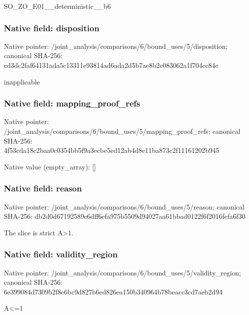 \documentclass[10pt,a4paper]{article}
\begin{document}
\begingroup\raggedright\sloppy SO\_\allowbreak{}ZO\_\allowbreak{}E01\_\allowbreak{}\_\allowbreak{}deterministic\_\allowbreak{}\_\allowbreak{}b6\par\endgroup

\subsubsection{Native field: disposition}
Native pointer: /joint\_\allowbreak{}analysis/comparisons/6/bound\_\allowbreak{}uses/5/disposition; canonical SHA-256: cd3dc2faf64131ada5c13311e93814ad6ada2d5b7ae8b2c083062a1f704cc84e

\begingroup\raggedright\sloppy inapplicable\par\endgroup

\subsubsection{Native field: mapping\_\allowbreak{}proof\_\allowbreak{}refs}
Native pointer: /joint\_\allowbreak{}analysis/comparisons/6/bound\_\allowbreak{}uses/5/mapping\_\allowbreak{}proof\_\allowbreak{}refs; canonical SHA-256: 4f53cda18c2baa0c0354bb5f9a3ecbe5ed12ab4d8e11ba873c2f11161202b945

Native value (empty\_\allowbreak{}array): []

\subsubsection{Native field: reason}
Native pointer: /joint\_\allowbreak{}analysis/comparisons/6/bound\_\allowbreak{}uses/5/reason; canonical SHA-256: db2d0d67192589e6dff6efa975b5509d94027aa61bbad0122f6f2016fefa6f30

\begingroup\raggedright\sloppy The slice is strict A>1.\par\endgroup

\subsubsection{Native field: validity\_\allowbreak{}region}
Native pointer: /joint\_\allowbreak{}analysis/comparisons/6/bound\_\allowbreak{}uses/5/validity\_\allowbreak{}region; canonical SHA-256: 6e399084d7309b2f8e6bc9d827b6ed826ea150b340964b78beacc3cd7aeb2d94

\begingroup\raggedright\sloppy A<=\allowbreak{}1\par\endgroup
\end{document}
